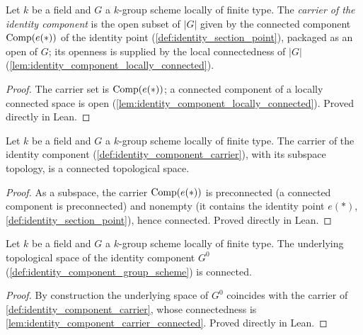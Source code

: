 \begin{definition}\leanok
  \label{def:identity_component_carrier}
  Let \(k\) be a field and \(G\) a \(k\)-group scheme locally of finite
  type. The \emph{carrier of the identity component} is the open subset of
  \(|G|\) given by the connected component
  \(\operatorname{Comp}(e(\ast))\) of the identity point
  (\cref{def:identity_section_point}), packaged as an open of \(G\); its
  openness is supplied by the local connectedness of \(|G|\)
  (\cref{lem:identity_component_locally_connected}).
\end{definition}
\begin{proof}
  The carrier set is \(\operatorname{Comp}(e(\ast))\); a connected component of a
  locally connected space is open
  (\cref{lem:identity_component_locally_connected}). Proved directly in
  Lean.
\end{proof}

\begin{lemma}\leanok
  \label{lem:identity_component_carrier_connected}
  Let \(k\) be a field and \(G\) a \(k\)-group scheme locally of finite
  type. The carrier of the identity component
  (\cref{def:identity_component_carrier}), with its subspace topology, is a
  connected topological space.
\end{lemma}
\begin{proof}
  As a subspace, the carrier \(\operatorname{Comp}(e(\ast))\) is preconnected (a
  connected component is preconnected) and nonempty (it contains the
  identity point \(e(\ast)\), \cref{def:identity_section_point}), hence
  connected. Proved directly in Lean.
\end{proof}

\begin{lemma}\leanok
  \label{lem:identity_component_connected}
  Let \(k\) be a field and \(G\) a \(k\)-group scheme locally of finite
  type. The underlying topological space of the identity component
  \(G^0\) (\cref{def:identity_component_group_scheme}) is connected.
\end{lemma}
\begin{proof}
  By construction the underlying space of \(G^0\) coincides with the
  carrier of \cref{def:identity_component_carrier}, whose connectedness is
  \cref{lem:identity_component_carrier_connected}. Proved directly in
  Lean.
\end{proof}

